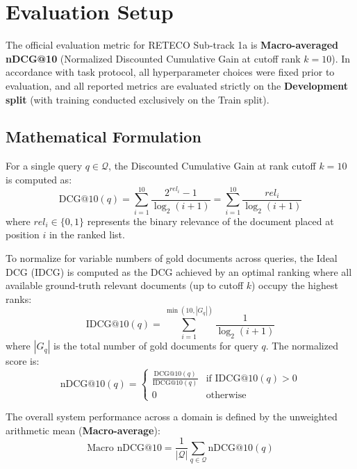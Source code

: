 \section{Evaluation Setup}
\label{sec:evaluation}

The official evaluation metric for RETECO Sub-track 1a is \textbf{Macro-averaged nDCG@10} (Normalized Discounted Cumulative Gain at cutoff rank $k=10$). In accordance with task protocol, all hyperparameter choices were fixed prior to evaluation, and all reported metrics are evaluated strictly on the \textbf{Development split} (with training conducted exclusively on the Train split).

\subsection{Mathematical Formulation}
For a single query $q \in \mathcal{Q}$, the Discounted Cumulative Gain at rank cutoff $k=10$ is computed as:
\begin{equation}
    \text{DCG}@10(q) = \sum_{i=1}^{10} \frac{2^{rel_i} - 1}{\log_2(i + 1)} = \sum_{i=1}^{10} \frac{rel_i}{\log_2(i + 1)}
\end{equation}
where $rel_i \in \{0, 1\}$ represents the binary relevance of the document placed at position $i$ in the ranked list.

To normalize for variable numbers of gold documents across queries, the Ideal DCG (IDCG) is computed as the DCG achieved by an optimal ranking where all available ground-truth relevant documents (up to cutoff $k$) occupy the highest ranks:
\begin{equation}
    \text{IDCG}@10(q) = \sum_{i=1}^{\min(10, |G_q|)} \frac{1}{\log_2(i + 1)}
\end{equation}
where $|G_q|$ is the total number of gold documents for query $q$. The normalized score is:
\begin{equation}
    \text{nDCG}@10(q) = \begin{cases} 
      \frac{\text{DCG}@10(q)}{\text{IDCG}@10(q)} & \text{if } \text{IDCG}@10(q) > 0 \\
      0 & \text{otherwise}
   \end{cases}
\end{equation}

The overall system performance across a domain is defined by the unweighted arithmetic mean (\textbf{Macro-average}):
\begin{equation}
    \text{Macro nDCG}@10 = \frac{1}{|\mathcal{Q}|} \sum_{q \in \mathcal{Q}} \text{nDCG}@10(q)
\end{equation}

